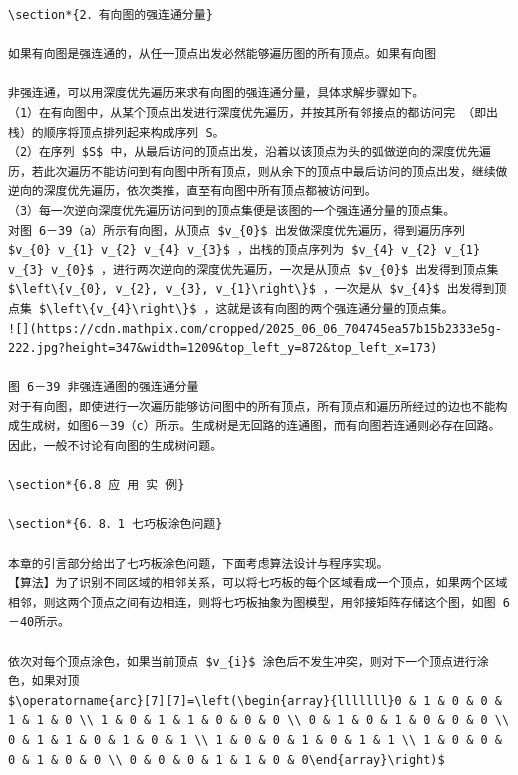 \documentclass[10pt]{article}
\begin{document}
\begin{verbatim}
\section*{2．有向图的强连通分量}

如果有向图是强连通的，从任一顶点出发必然能够遍历图的所有顶点。如果有向图

非强连通，可以用深度优先遍历来求有向图的强连通分量，具体求解步骤如下。
（1）在有向图中，从某个顶点出发进行深度优先遍历，并按其所有邻接点的都访问完 （即出栈）的顺序将顶点排列起来构成序列 S。
（2）在序列 $S$ 中，从最后访问的顶点出发，沿着以该顶点为头的弧做逆向的深度优先遍历，若此次遍历不能访问到有向图中所有顶点，则从余下的顶点中最后访问的顶点出发，继续做逆向的深度优先遍历，依次类推，直至有向图中所有顶点都被访问到。
（3）每一次逆向深度优先遍历访问到的顶点集便是该图的一个强连通分量的顶点集。
对图 6－39（a）所示有向图，从顶点 $v_{0}$ 出发做深度优先遍历，得到遍历序列 $v_{0} v_{1} v_{2} v_{4} v_{3}$ ，出栈的顶点序列为 $v_{4} v_{2} v_{1} v_{3} v_{0}$ ，进行两次逆向的深度优先遍历，一次是从顶点 $v_{0}$ 出发得到顶点集 $\left\{v_{0}, v_{2}, v_{3}, v_{1}\right\}$ ，一次是从 $v_{4}$ 出发得到顶点集 $\left\{v_{4}\right\}$ ，这就是该有向图的两个强连通分量的顶点集。
![](https://cdn.mathpix.com/cropped/2025_06_06_704745ea57b15b2333e5g-222.jpg?height=347&width=1209&top_left_y=872&top_left_x=173)

图 6－39 非强连通图的强连通分量
对于有向图，即使进行一次遍历能够访问图中的所有顶点，所有顶点和遍历所经过的边也不能构成生成树，如图6－39（c）所示。生成树是无回路的连通图，而有向图若连通则必存在回路。因此，一般不讨论有向图的生成树问题。

\section*{6.8 应 用 实 例}

\section*{6．8．1 七巧板涂色问题}

本章的引言部分给出了七巧板涂色问题，下面考虑算法设计与程序实现。
【算法】为了识别不同区域的相邻关系，可以将七巧板的每个区域看成一个顶点，如果两个区域相邻，则这两个顶点之间有边相连，则将七巧板抽象为图模型，用邻接矩阵存储这个图，如图 6－40所示。

依次对每个顶点涂色，如果当前顶点 $v_{i}$ 涂色后不发生冲突，则对下一个顶点进行涂色，如果对顶
$\operatorname{arc}[7][7]=\left(\begin{array}{lllllll}0 & 1 & 0 & 0 & 1 & 1 & 0 \\ 1 & 0 & 1 & 1 & 0 & 0 & 0 \\ 0 & 1 & 0 & 1 & 0 & 0 & 0 \\ 0 & 1 & 1 & 0 & 1 & 0 & 1 \\ 1 & 0 & 0 & 1 & 0 & 1 & 1 \\ 1 & 0 & 0 & 0 & 1 & 0 & 0 \\ 0 & 0 & 0 & 1 & 1 & 0 & 0\end{array}\right)$


\end{verbatim}
\end{document}
